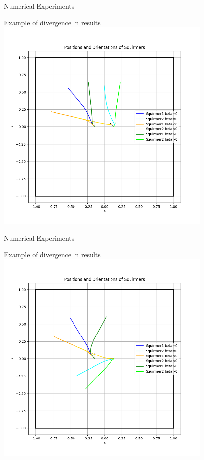 \documentclass{beamer}
\begin{document}
\begin{frame}{Numerical Experiments}
    \begin{center}
        Example of divergence in results
        \includegraphics[width=0.8\textwidth]{../../graphs/simulations/twosquirmerinter/sq2.3pi.4.png}
    \end{center}
\end{frame}

\begin{frame}{Numerical Experiments}
    \begin{center}
        Example of divergence in results
        \includegraphics[width=0.8\textwidth]{../../graphs/simulations/twosquirmerinter/sq2.pi.png}
    \end{center}
\end{frame}
\end{document}
